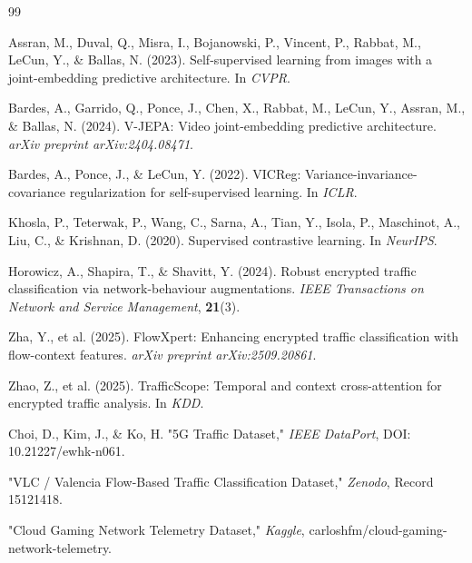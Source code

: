 \documentclass{article}
\begin{document}
\begin{thebibliography}{99}

Assran, M., Duval, Q., Misra, I., Bojanowski, P., Vincent, P., Rabbat, M., LeCun, Y., \& Ballas, N. (2023). Self-supervised learning from images with a joint-embedding predictive architecture. In \textit{CVPR}.

Bardes, A., Garrido, Q., Ponce, J., Chen, X., Rabbat, M., LeCun, Y., Assran, M., \& Ballas, N. (2024). V-JEPA: Video joint-embedding predictive architecture. \textit{arXiv preprint arXiv:2404.08471}.

Bardes, A., Ponce, J., \& LeCun, Y. (2022). VICReg: Variance-invariance-covariance regularization for self-supervised learning. In \textit{ICLR}.

Khosla, P., Teterwak, P., Wang, C., Sarna, A., Tian, Y., Isola, P., Maschinot, A., Liu, C., \& Krishnan, D. (2020). Supervised contrastive learning. In \textit{NeurIPS}.

Horowicz, A., Shapira, T., \& Shavitt, Y. (2024). Robust encrypted traffic classification via network-behaviour augmentations. \textit{IEEE Transactions on Network and Service Management}, \textbf{21}(3).

Zha, Y., et al. (2025). FlowXpert: Enhancing encrypted traffic classification with flow-context features. \textit{arXiv preprint arXiv:2509.20861}.

Zhao, Z., et al. (2025). TrafficScope: Temporal and context cross-attention for encrypted traffic analysis. In \textit{KDD}.

Choi, D., Kim, J., \& Ko, H. "5G Traffic Dataset," \textit{IEEE DataPort}, DOI: 10.21227/ewhk-n061.

"VLC / Valencia Flow-Based Traffic Classification Dataset," \textit{Zenodo}, Record 15121418.

"Cloud Gaming Network Telemetry Dataset," \textit{Kaggle}, carloshfm/cloud-gaming-network-telemetry.

\end{thebibliography}
\end{document}
